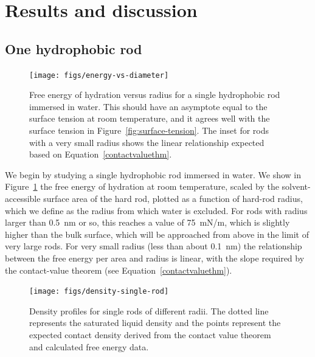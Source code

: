 \documentclass[letterpaper,twocolumn,amsmath,amssymb,prb]{revtex4-1}
\begin{document}
\section{Results and discussion}

\subsection{One hydrophobic rod}

\begin{figure}
\begin{center}
\texttt{[image: figs/energy-vs-diameter]}
\end{center}
\caption{ Free energy of hydration versus radius for a single hydrophobic rod
immersed in water. This should have an asymptote equal to the surface
tension at room temperature, and it agrees well with the surface tension in
Figure~\ref{fig:surface-tension}. The inset for rods with a very small 
radius shows the linear relationship expected based on 
Equation~\ref{contactvaluethm}.}
\label{fig:energy-vs-diameter}
\end{figure}

We begin by studying a single hydrophobic rod immersed in water.
We show in Figure~\ref{fig:energy-vs-diameter} the free energy of
hydration at room temperature, scaled by the solvent-accessible
surface area of the hard rod, plotted as a function of hard-rod
radius, which we define as the radius from which water is excluded.
For rods with radius larger than 0.5~nm or so, this reaches a value of
75~mN/m, which is slightly higher than the bulk surface, which will be
approached from above in the limit of very large rods.  For very small
radius (less than about 0.1~nm) the relationship between the free
energy per area and radius is linear, with the slope required by the
contact-value theorem (see Equation~\ref{contactvaluethm}).

\begin{figure}
\begin{center}
\texttt{[image: figs/density-single-rod]}
\end{center}
\caption{ Density profiles for single rods of different radii. The dotted line
represents the saturated liquid density and the points represent the
expected contact density derived from the contact value theorem and
calculated free energy data.}
\label{fig:density-single-rod}
\end{figure}
\end{document}
